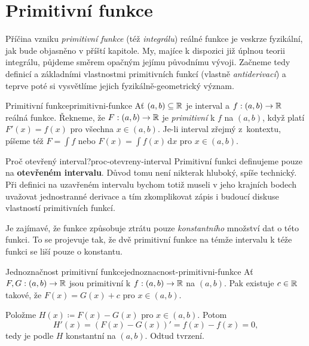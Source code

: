 \chapter{Primitivní funkce}
\label{chap:primitivni-funkce}


Příčina vzniku \emph{primitivní funkce} (též \emph{integrálu}) reálné funkce je
veskrze fyzikální, jak bude objasněno v příští kapitole. My, majíce k dispozici
již úplnou teorii integrálu, půjdeme směrem opačným jejímu původnímu vývoji.
Začneme tedy definicí a základními vlastnostmi primitivních funkcí (vlastně
\emph{antiderivací}) a teprve poté si vysvětlíme jejich fyzikálně-geometrický
význam.

\begin{definition}{Primitivní funkce}{primitivni-funkce}
 Ať $(a,b) \subseteq \mathbb{R}$ je interval a $f:(a,b) \to \mathbb{R}$ reálná funkce. Řekneme,
 že $F:(a,b) \to \mathbb{R}$ je \emph{primitivní} k $f$ na $(a,b)$, když platí $F'(x) =
 f(x)$ pro všechna $x \in (a,b)$. Je-li interval zřejmý z~kontextu, píšeme též
 $F = \int f$ nebo  $F(x) = \int f(x) \, \mathrm{d}x$ pro $x \in
 (a,b)$.
\end{definition}

\begin{remark}{Proč otevřený interval?}{proc-otevreny-interval}
 Primitivní funkci definujeme pouze na \textbf{otevřeném intervalu}. Důvod tomu
 není nikterak hluboký, spíše technický. Při definici na uzavřeném intervalu
 bychom totiž museli v jeho krajních bodech uvažovat jednostranné derivace a tím
 zkomplikovat zápis i budoucí diskuse vlastností primitivních funkcí.
\end{remark}

Je zajímavé, že  funkce způsobuje ztrátu pouze
\emph{konstantního} množství dat o této funkci. To se projevuje tak, že dvě
primitivní funkce na témže intervalu k téže funkci se liší pouze o konstantu.

\begin{lemma}{Jednoznačnost primitivní funkce}{jednoznacnost-primitivni-funkce}
 Ať $F,G:(a,b) \to \mathbb{R}$ jsou primitivní k $f:(a,b) \to \mathbb{R}$ na $(a,b)$. Pak
 existuje $c \in \mathbb{R}$ takové, že $F(x) = G(x) + c$ pro $x \in (a,b)$.
\end{lemma}
\begin{lemproof}
 Položme $H(x) \coloneqq F(x) - G(x)$ pro $x \in (a,b)$. Potom
 \[
  H'(x) = (F(x) - G(x))' = f(x) - f(x) = 0,
 \]
 tedy je podle  $H$ konstantní na
 $(a,b)$. Odtud tvrzení.
\end{lemproof}

